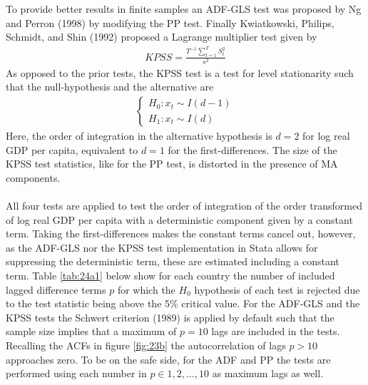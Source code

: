 To provide better results in finite samples an ADF-GLS test was proposed by Ng and Perron (1998) by modifying the PP test. Finally Kwiatkowski, Philips, Schmidt, and Shin (1992) proposed a Lagrange multiplier test given by
\begin{align}
  KPSS=\frac{T^{-1}\sum_{t=1}^T S_t^2}{s^2} \label{eq:KPSS}
\end{align}
As opposed to the prior tests, the KPSS test is a test for level stationarity such that the null-hypothesis and the alternative are
\begin{align}
  \left\{\begin{array}{l}
  H_0: x_t\sim I(d-1)\\
  H_1: x_t\sim I(d)
  \end{array}\right.
  \label{eq:H0-KPSS}
\end{align}
Here, the order of integration in the alternative hypothesis is $d=2$ for log real GDP per capita, equivalent to $d=1$ for the first-differences. The size of the KPSS test statistics, like for the PP test, is distorted in the presence of MA components.
\\
\\
All four tests are applied to test the order of integration of the  order transformed of log real GDP per capita with a deterministic component given by a constant term. Taking the first-differences makes the constant terms cancel out, however, as the ADF-GLS nor the KPSS test implementation in Stata allows for suppressing the deterministic term, these are estimated including a constant term.
Table \ref{tab:24a1} below show for each country the number of included lagged difference terms $p$ for which the $H_0$ hypothesis of each test is rejected due to the test statistic being above the 5\% critical value. For the ADF-GLS and the KPSS tests the Schwert criterion (1989) is applied by default such that the sample size implies that a maximum of $p=10$ lags are included in the tests. Recalling the ACFs in figure \ref{fig:23b} the autocorrelation of lags $p>10$ approaches zero. To be on the safe side, for the ADF and PP the tests are performed using each number in $p\in1,2,\dots,10$ as maximum lags as well.


